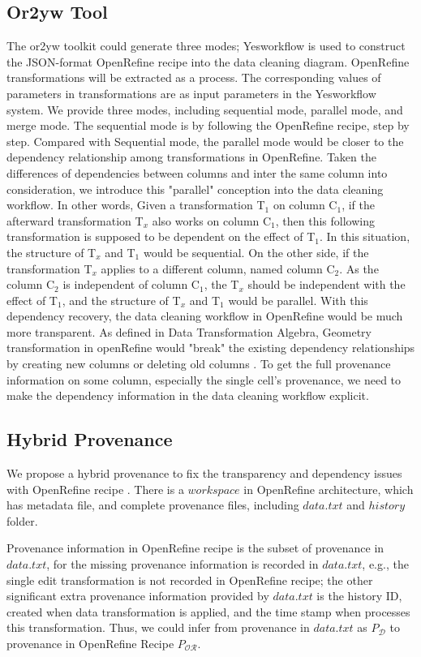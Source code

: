 \subsection{Or2yw Tool}
The or2yw toolkit could generate three modes; Yesworkflow is used to construct the JSON-format OpenRefine recipe into the data cleaning diagram. OpenRefine transformations will be extracted as a process. The corresponding values of parameters in transformations are as input parameters in the Yesworkflow system. We provide three modes, including sequential mode, parallel mode, and merge mode. The sequential mode is by following the OpenRefine recipe, step by step. Compared with Sequential mode, the parallel mode would be closer to the dependency relationship among transformations in OpenRefine. Taken the differences of dependencies between columns and inter the same column into consideration, we introduce this "parallel" conception into the data cleaning workflow. In other words, Given a transformation T{$_1$} on column C{$_1$}, if the afterward transformation T{$_x$} also works on column C{$_1$}, then this following transformation is supposed to be dependent on the effect of T{$_1$}. In this situation, the structure of T{$_x$} and T{$_1$} would be sequential. On the other side, if the transformation  T{$_x$} applies to a different column, named column C{$_2$}. As the column C{$_2$} is independent of column C{$_1$}, the  T{$_x$} should be independent with the effect of T{$_1$}, and the structure of T{$_x$} and T{$_1$} would be parallel. With this dependency recovery, the data cleaning workflow in OpenRefine would be much more transparent. As defined in Data Transformation Algebra, Geometry transformation in openRefine would "break" the existing dependency relationships by creating new columns or deleting old columns \cite{nunez2020first}. To get the full provenance information on some column, especially the single cell's provenance, we need to make the dependency information in the data cleaning workflow explicit. 


\subsection{Hybrid Provenance}
We propose a hybrid provenance to fix the transparency and dependency issues with OpenRefine recipe \cite{li2019towards}. There is a $workspace$ in OpenRefine architecture, which has metadata file, and complete provenance files, including $data.txt$ and $history$ folder. 

Provenance information in OpenRefine recipe is the subset of provenance in $data.txt$, for the missing provenance information is recorded in $data.txt$, e.g., the single edit transformation is not recorded in OpenRefine recipe; the other significant extra provenance information provided by $data.txt$ is the history ID, created when data transformation is applied, and the time stamp when processes this transformation.  Thus, we could infer from provenance in $data.txt$ as $P_\mathcal{D}$ to provenance in OpenRefine Recipe $P_\mathcal{OR}$.

